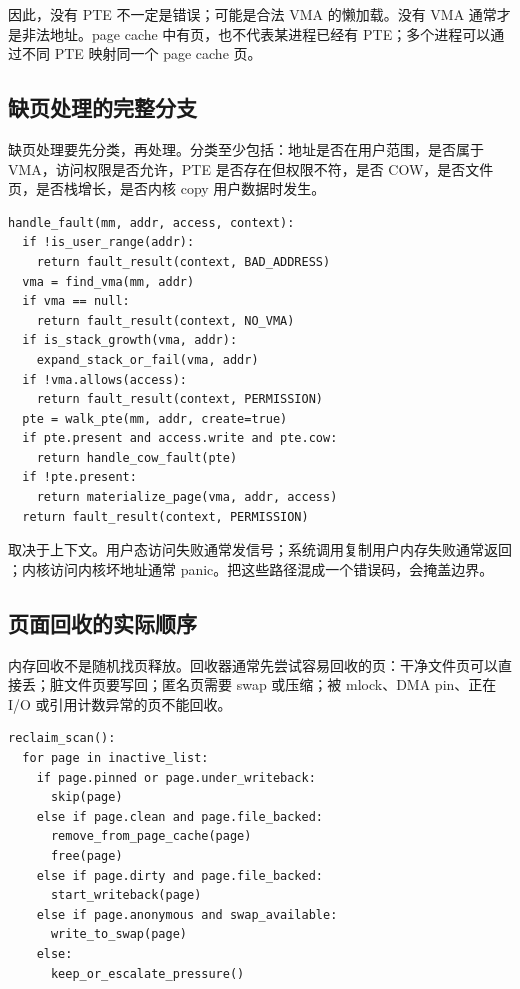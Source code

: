 因此，没有 PTE 不一定是错误；可能是合法 VMA 的懒加载。没有 VMA 通常才是非法地址。page cache 中有页，也不代表某进程已经有 PTE；多个进程可以通过不同 PTE 映射同一个 page cache 页。

\subsection{缺页处理的完整分支}

缺页处理要先分类，再处理。分类至少包括：地址是否在用户范围，是否属于 VMA，访问权限是否允许，PTE 是否存在但权限不符，是否 COW，是否文件页，是否栈增长，是否内核 copy 用户数据时发生。

\begin{lstlisting}
handle_fault(mm, addr, access, context):
  if !is_user_range(addr):
    return fault_result(context, BAD_ADDRESS)
  vma = find_vma(mm, addr)
  if vma == null:
    return fault_result(context, NO_VMA)
  if is_stack_growth(vma, addr):
    expand_stack_or_fail(vma, addr)
  if !vma.allows(access):
    return fault_result(context, PERMISSION)
  pte = walk_pte(mm, addr, create=true)
  if pte.present and access.write and pte.cow:
    return handle_cow_fault(pte)
  if !pte.present:
    return materialize_page(vma, addr, access)
  return fault_result(context, PERMISSION)
\end{lstlisting}

 取决于上下文。用户态访问失败通常发信号；系统调用复制用户内存失败通常返回 ；内核访问内核坏地址通常 panic。把这些路径混成一个错误码，会掩盖边界。

\subsection{页面回收的实际顺序}

内存回收不是随机找页释放。回收器通常先尝试容易回收的页：干净文件页可以直接丢；脏文件页要写回；匿名页需要 swap 或压缩；被 mlock、DMA pin、正在 I/O 或引用计数异常的页不能回收。

\begin{lstlisting}
reclaim_scan():
  for page in inactive_list:
    if page.pinned or page.under_writeback:
      skip(page)
    else if page.clean and page.file_backed:
      remove_from_page_cache(page)
      free(page)
    else if page.dirty and page.file_backed:
      start_writeback(page)
    else if page.anonymous and swap_available:
      write_to_swap(page)
    else:
      keep_or_escalate_pressure()
\end{lstlisting}

